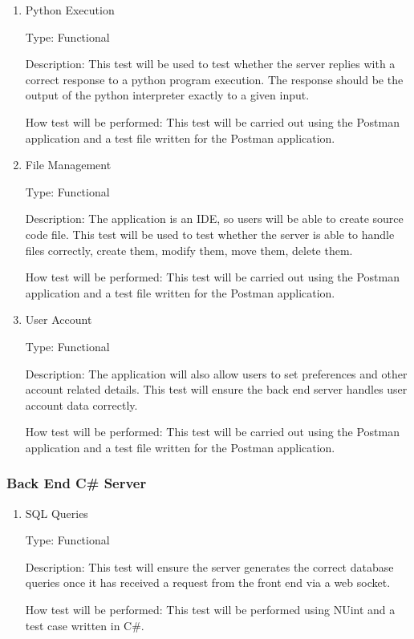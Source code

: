 \documentclass[12pt, titlepage]{article}
\begin{document}
\begin{enumerate}
\item{Python Execution\\}

Type: Functional
					
Description: This test will be used to test whether the server replies with a 
correct response to a python program execution. The response should be the output
of the python interpreter exactly to a given input.

How test will be performed: This test will be carried out using the Postman
application and a test file written for the Postman application.

\item{File Management\\}

Type: Functional
					
Description: The application is an IDE, so users will be able to create source
code file. This test will be used to test whether the server is able to handle
files correctly, create them, modify them, move them, delete them.

How test will be performed: This test will be carried out using the Postman
application and a test file written for the Postman application.

\item{User Account\\}

Type: Functional
					
Description: The application will also allow users to set preferences and other
account related details. This test will ensure the back end server handles user
account data correctly.

How test will be performed: This test will be carried out using the Postman
application and a test file written for the Postman application.
					
\end{enumerate}


\subsubsection{Back End C\# Server}

\begin{enumerate}

\item{SQL Queries\\}

Type: Functional
					
Description: This test will ensure the server generates the correct database
queries once it has received a request from the front end via a web socket.

How test will be performed: This test will be performed using NUint and a test
case written in C\#.

\end{enumerate}
\end{document}
